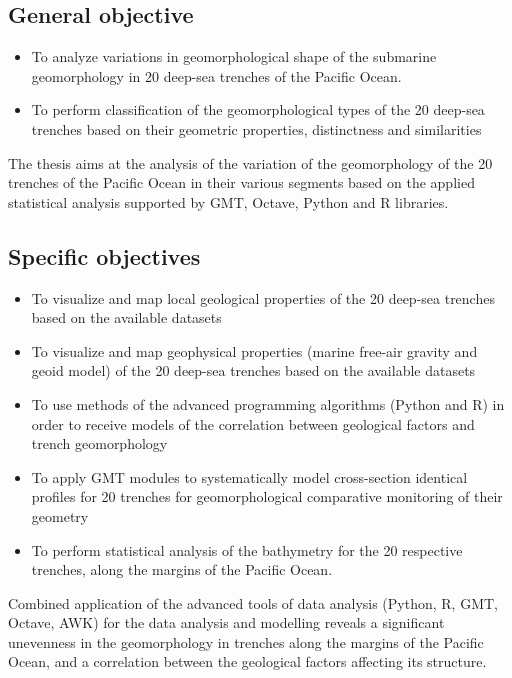 \documentclass[11pt,a4paper]{report}
\begin{document}
\subsection{General objective}

\begin{itemize}
	\item To analyze variations in geomorphological shape of the submarine geomorphology in 20 deep-sea trenches of the Pacific Ocean.
	\item To perform classification of the geomorphological types of the 20 deep-sea trenches based on their geometric properties, distinctness and similarities
\end{itemize}

The thesis aims at the analysis of the variation of the geomorphology of the 20 trenches of the Pacific Ocean in their various segments based on the applied statistical analysis supported by GMT, Octave, Python and R libraries.

\subsection{Specific objectives}

\begin{itemize}
	\item To visualize and map local geological properties of the 20 deep-sea trenches based on the available datasets
	\item To visualize and map geophysical properties (marine free-air gravity and geoid model) of the 20 deep-sea trenches based on the available datasets
	\item To use methods of the advanced programming algorithms (Python and R) in order to receive models of the correlation between geological factors and trench geomorphology
	\item To apply GMT modules to systematically model cross-section identical profiles for 20 trenches for geomorphological comparative monitoring of their geometry
	\item To perform statistical analysis of the bathymetry for the 20 respective trenches, along the margins of the Pacific Ocean.
\end{itemize}

Combined application of the advanced tools of data analysis (Python, R, GMT, Octave, AWK) for the data analysis and modelling reveals a significant unevenness in the geomorphology in trenches along the margins of the Pacific Ocean, and a correlation between the geological factors affecting its structure. 
\end{document}
